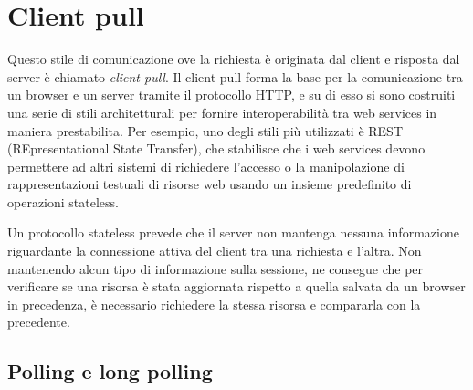 \documentclass[12pt,a4paper,openright]{report}
\begin{document}
\section{Client pull}\label{sec_clientpull}

Questo stile di comunicazione ove la richiesta è originata dal client e risposta dal server è chiamato \textit{client pull}. Il client pull forma la base per la comunicazione tra un browser e un server tramite il protocollo HTTP, e su di esso si sono costruiti una serie di stili architetturali per fornire interoperabilità tra web services in maniera prestabilita. Per esempio, uno degli stili più utilizzati è REST (REpresentational State Transfer), che stabilisce che i web services devono permettere ad altri sistemi di richiedere l’accesso o la manipolazione di rappresentazioni testuali di risorse web usando un insieme predefinito di operazioni stateless.

\bigskip

Un protocollo stateless prevede che il server non mantenga nessuna informazione riguardante la connessione attiva del client tra una richiesta e l’altra. Non mantenendo alcun tipo di informazione sulla sessione, ne consegue che per verificare se una risorsa è stata aggiornata rispetto a quella salvata da un browser in precedenza, è necessario richiedere la stessa risorsa e compararla con la precedente.

\subsection{Polling e long polling}
\end{document}
